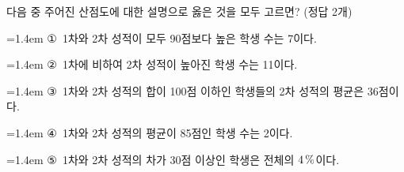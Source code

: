 다음 중 주어진 산점도에 대한 설명으로 옳은 것을 모두 고르면? (정답 2개)
\par\medskip\par\noindent\hangindent=1.4em {\small ①}\ 1차와 2차 성적이 모두 90점보다 높은 학생 수는 7이다.\par\noindent\hangindent=1.4em {\small ②}\ 1차에 비하여 2차 성적이 높아진 학생 수는 11이다.\par\noindent\hangindent=1.4em {\small ③}\ 1차와 2차 성적의 합이 100점 이하인 학생들의 2차 성적의 평균은 36점이다.\par\noindent\hangindent=1.4em {\small ④}\ 1차와 2차 성적의 평균이 85점인 학생 수는 2이다.\par\noindent\hangindent=1.4em {\small ⑤}\ 1차와 2차 성적의 차가 30점 이상인 학생은 전체의 $4\mkern3mu \%$이다.\par\medskip
